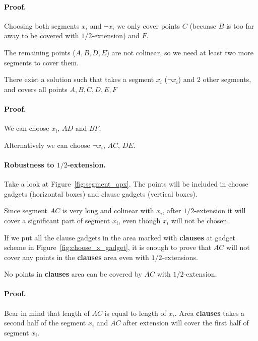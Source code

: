 \paragraph{Proof.}
Choosing both segments $x_i$ and $\neg x_i$
we only cover points $C$
(becuase $B$ is too far away to be covered with $1/2$-extension)
and $F$.

The remaining points ($A, B, D, E$) are not colinear,
so we need at least two more segments to cover them.


\begin{lemma}
\label{choose_variables_solution}
There exist a solution such that takes a segment $x_i$ ($\neg x_i$)
and 2 other segments, and covers all points $A, B, C, D, E, F$
\end{lemma}

\paragraph{Proof.}
We can choose $x_i$, $AD$ and $BF$.

Alternatively we can choose $\neg x_i$, $AC$, $DE$.

\paragraph{Robustness to $1/2$-extension.}
Take a look at Figure~\ref{fig:segment_apx}.
The points will be included in choose gadgets (horizontal boxes)
and clause gadgets (vertical boxes).

Since segment $AC$ is very long
and colinear with $x_i$, after $1/2$-extension
it will cover a significant part of segment $x_i$,
even though $x_i$ will not be chosen.

If we put all the clause gadgets in the area
marked with \textbf{clauses} at gadget scheme in Figure~\ref{fig:choose_x_gadget},
it is enough to prove that $AC$ will not cover any points
in the \textbf{clauses} area even with $1/2$-extensions.

\begin{lemma}
No points in \textbf{clauses} area can be covered
by $AC$ with $1/2$-extension.
\end{lemma}

\paragraph{Proof.}
Bear in mind that length of $AC$ is equal to length of $x_i$.
Area \textbf{clauses} takes a second half
of the segment $x_i$ and $AC$ after extension will cover the first
half of segment $x_i$.

